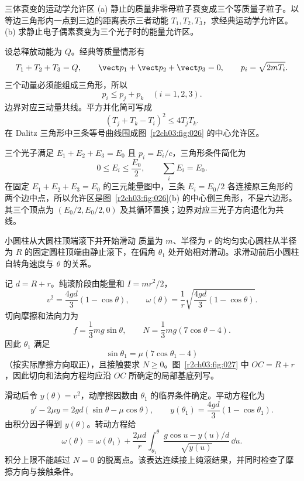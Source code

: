 \begin{practicebox}{三体衰变的运动学允许区}
(a) 静止的质量非零母粒子衰变成三个等质量子粒子。以等边三角形内一点到三边的距离表示三者动能 $T_1,T_2,T_3$，求经典运动学允许区。\\
(b) 求静止电子偶素衰变为三个光子时的能量允许区。
\label{r2ch03:pr:010}
\begin{solution}
设总释放动能为 $Q$。经典等质量情形有
\[
 T_1+T_2+T_3=Q,\qquad
 \vect p_1+\vect p_2+\vect p_3=0,\qquad
 p_i=\sqrt{2mT_i}.
\]
三个动量必须能组成三角形，所以
\[
 p_i\le p_j+p_k\quad(i=1,2,3).
\]
边界对应三动量共线。平方并化简可写成
\[
 (T_j+T_k-T_i)^2\le4T_jT_k .
\]
在 Dalitz 三角形中三条等号曲线围成图~\ref{r2ch03:fig:026} 的中心允许区。

三个光子满足 $E_1+E_2+E_3=E_0$ 且 $p_i=E_i/c$，三角形条件简化为
\[
 \boxed{0\le E_i\le\frac{E_0}{2},\qquad \sum_iE_i=E_0}.
\]
在固定 $E_1+E_2+E_3=E_0$ 的三元能量图中，三条 $E_i=E_0/2$ 各连接原三角形的两个边中点，所以允许区是图~\ref{r2ch03:fig:026}(b) 的中心倒三角形，不是六边形。其三个顶点为 $(E_0/2,E_0/2,0)$ 及其循环置换；边界对应三光子方向退化为共线。
\figThreeBodyRegion
\end{solution}
\end{practicebox}

\begin{practicebox}{小圆柱从大圆柱顶端滚下并开始滑动}
质量为 $m$、半径为 $r$ 的均匀实心圆柱从半径为 $R$ 的固定圆柱顶端由静止滚下，在偏角 $\theta_1$ 处开始相对滑动。求滑动前后小圆柱自转角速度与 $\theta$ 的关系。
\label{r2ch03:pr:011}
\begin{solution}
记 $d=R+r$。纯滚阶段由能量和 $I=mr^2/2$，
\[
 v^2=\frac{4gd}{3}(1-\cos\theta),\qquad
 \boxed{\omega(\theta)=\frac1r
 \sqrt{\frac{4gd}{3}(1-\cos\theta)}}.
\]
切向摩擦和法向力为
\[
 f=\frac13mg\sin\theta,\qquad
 N=\frac13mg(7\cos\theta-4).
\]
因此 $\theta_1$ 满足
\[
 \boxed{\sin\theta_1=\mu(7\cos\theta_1-4)}
\]
（按实际摩擦方向取正），且接触要求 $N\ge0$。图~\ref{r2ch03:fig:027} 中 $OC=R+r$，因此切向和法向方程均应沿 $OC$ 所确定的局部基底列写。

滑动后令 $y(\theta)=v^2$，动摩擦因数由 $\theta_1$ 的临界条件确定。平动方程化为
\[
 y'-2\mu y=2gd(\sin\theta-\mu\cos\theta),\qquad
 y(\theta_1)=\frac{4gd}{3}(1-\cos\theta_1).
\]
由积分因子得到 $y(\theta)$。转动方程给
\[
 \boxed{\omega(\theta)=\omega(\theta_1)
 +\frac{2\mu d}{r}\int_{\theta_1}^{\theta}
 \frac{g\cos u-y(u)/d}{\sqrt{y(u)}}\,\dd u}.
\]
积分上限不能越过 $N=0$ 的脱离点。该表达连续接上纯滚结果，并同时检查了摩擦方向与接触条件。
\figSmallCylinderOnLarge
\end{solution}
\end{practicebox}

